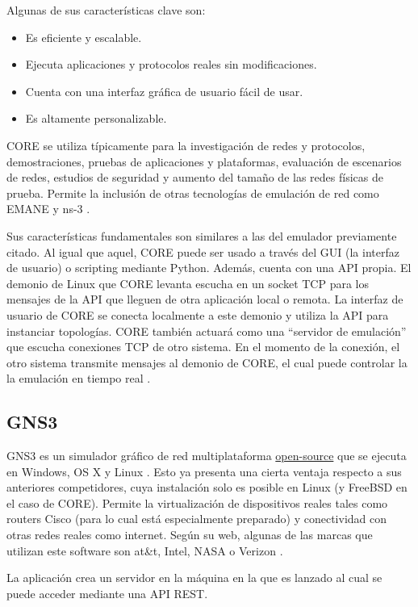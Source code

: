 Algunas de sus características clave son:
\begin{itemize}
\item Es eficiente y escalable.
\item Ejecuta aplicaciones y protocolos reales sin modificaciones.
\item Cuenta con una interfaz gráfica de usuario fácil de usar.
\item Es altamente personalizable.
\end{itemize}

CORE se utiliza típicamente para la investigación de redes y protocolos, demostraciones, pruebas de aplicaciones y plataformas, evaluación de escenarios de redes, estudios de seguridad y aumento del tamaño de las redes físicas de prueba. Permite la inclusión de otras tecnologías de emulación de red como EMANE y ns-3 \cite{core}.

Sus características fundamentales son similares a las del emulador previamente citado. Al igual que aquel, CORE puede ser usado a través del GUI (la interfaz de usuario) o scripting mediante Python. Además, cuenta con una API propia. El demonio de Linux que CORE levanta escucha en un socket TCP para los mensajes de la API que lleguen de otra aplicación local o remota. La interfaz de usuario de CORE se conecta localmente a este demonio y utiliza la API para instanciar topologías. CORE también actuará como una ``servidor de emulación'' que escucha conexiones TCP de otro sistema. En el momento de la conexión, el otro sistema transmite mensajes al demonio de CORE, el cual puede controlar la la emulación en tiempo real \cite{coreapi}.

\subsection{GNS3}
GNS3 es un simulador gráfico de red multiplataforma \href{https://github.com/GNS3}{open-source} que se ejecuta en Windows, OS X y Linux \cite{bookgns}. Esto ya presenta una cierta ventaja respecto a sus anteriores competidores, cuya instalación solo es posible en Linux (y FreeBSD en el caso de CORE). Permite la virtualización de dispositivos reales tales como routers Cisco (para lo cual está especialmente preparado) y conectividad con otras redes reales como internet. Según su web, algunas de las marcas que utilizan este software son at\&t, Intel, NASA o Verizon \cite{gnsweb}.

La aplicación crea un servidor en la máquina en la que es lanzado al cual se puede acceder mediante una API REST. 

